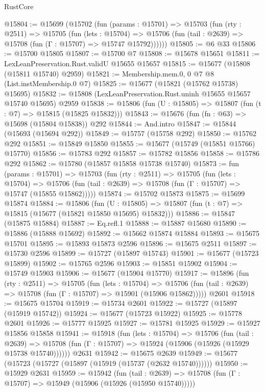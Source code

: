 \begin{lexlean}{RustCore}
\begin{coremodule}
@15804 := @15699
    (@15702
      (fun (params : @15701) =>
      @15703
        (fun (rty : @2511) =>
        @15705
          (fun (lets : @15704) =>
          @15706 (fun (tail : @2639) => @15708 (fun (Γ : @15707) => @15747 @15792))))))
@15805 := @6 @33
@15806 := @15700 @15805
@15807 := @15700 @7
@15808 := @15678 @15651
@15811 := LexLeanPreservation.Rust.validU @15655 @15657
@15815 := @15677 (@15808 (@15811 @15740) @2959)
@15821 := Membership.mem.{0, 0} @7 @8 (List.instMembership.{0} @7)
@15825 := @15677 (@15821 (@15762 @15738) @15695)
@15832 := @15808 (LexLeanPreservation.Rust.uninh @15655 @15657 @15740 @15695) @2959
@15838 := @15806 (fun (U : @15805) => @15807 (fun (t : @7) => @15815 (@15825 @15832)))
@15843 := @15676 (fun (fn : @63) => @15698 (@15804 @15838)) @292
@15844 := And.intro
@15847 := @15844 (@15693 (@15694 @292))
@15849 := @15757 (@15758 @292)
@15850 := @15762 @292
@15851 := @15849 @15850
@15855 := @15677 (@15749 (@15851 @15766) @15770)
@15856 := @15783 @292
@15857 := @15782 @15856
@15858 := @15786 @292
@15862 := @15780 (@15857 @15858 @15738 @15740)
@15873 := fun (params : @15701) =>
  @15703
    (fun (rty : @2511) =>
    @15705
      (fun (lets : @15704) =>
      @15706 (fun (tail : @2639) => @15708 (fun (Γ : @15707) => @15747 (@15855 @15862)))))
@15874 := @15702 @15873
@15875 := @15699 @15874
@15884 := @15806
    (fun (U : @15805) => @15807 (fun (t : @7) => @15815 (@15677 (@15821 @15850 @15695) @15832)))
@15886 := @15847 (@15875 @15884)
@15887 := Eq.refl.{1}
@15888 := @15887 @15680
@15890 := @15886 (@15888 @15692)
@15892 := @15662 @15874 @15884
@15893 := @15675 @15701
@15895 := @15893 @15873 @2596
@15896 := @15675 @2511
@15897 := @15730 @2596
@15899 := @15727 (@15897 @15743)
@15901 := @15677 (@15723 @15899)
@15902 := @15765 @2596
@15903 := @15851 @15902
@15904 := @15749 @15903
@15906 := @15677 (@15904 @15770)
@15917 := @15896
    (fun (rty : @2511) =>
    @15705
      (fun (lets : @15704) =>
      @15706 (fun (tail : @2639) => @15708 (fun (Γ : @15707) => @15901 (@15906 @15862)))))
    @2601
@15918 := @15675 @15704
@15919 := @15734 @2601
@15922 := @15727 (@15897 (@15919 @15742))
@15924 := @15677 (@15723 @15922)
@15925 := @15778 @2601
@15926 := @15777 @15925
@15927 := @15781 @15925
@15929 := @15927 @15856 @15858
@15941 := @15918
    (fun (lets : @15704) =>
    @15706
      (fun (tail : @2639) =>
      @15708 (fun (Γ : @15707) => @15924 (@15906 (@15926 (@15929 @15738 @15740))))))
    @2631
@15942 := @15675 @2639
@15949 := @15677 (@15723 (@15727 (@15897 (@15919 (@15737 (@2632 @15740))))))
@15950 := @15929 @2631
@15959 := @15942
    (fun (tail : @2639) => @15708 (fun (Γ : @15707) => @15949 (@15906 (@15926 (@15950 @15740)))))

\end{coremodule}
\end{lexlean}
